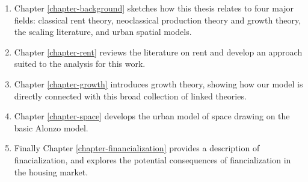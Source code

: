 \begin{enumerate}
    \item Chapter \ref{chapter-background} sketches how this thesis relates to four major fields: classical rent theory, neoclassical production theory and growth theory, the scaling literature, and urban spatial models. %
    \item Chapter \ref{chapter-rent} reviews the literature on rent and develop an approach suited to the analysis for this work.
    \item Chapter \ref{chapter-growth} introduces growth theory, showing how our model is directly connected with this broad collection of linked theories. %
    \item Chapter \ref{chapter-space} develops the urban model of space drawing on the basic Alonzo model.
    \item Finally Chapter \ref{chapter-financialization} provides a description of finacialization, and explores the potential consequences of fiancialization in the housing market.  %
\end{enumerate}
 

